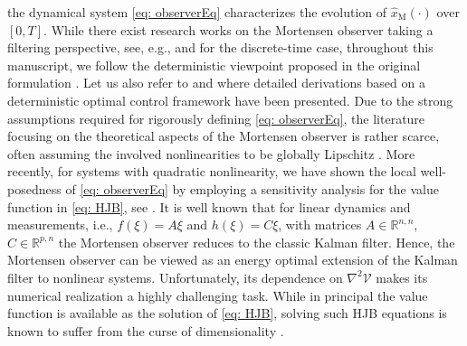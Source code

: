 \documentclass[11pt,reqno]{amsart}
\numberwithin{equation}{section}
\theoremstyle{plain}
\begin{document}
the dynamical system \eqref{eq: observerEq} characterizes the evolution of $\widehat{x}_{\mathrm{M}}(\cdot)$ over $[0,T]$. While there exist research works on the Mortensen observer taking a filtering perspective, see, e.g., \cite{Hij80,Hij82,ChaEtAl23,ChauMeMoZi25} and \cite{Moi18} for the discrete-time case, throughout this manuscript, we follow the deterministic viewpoint proposed in the original formulation \cite{Mor68}. Let us also refer to \cite{Fle97} and \cite{Wil04} where detailed derivations based on a deterministic optimal control framework have been presented. Due to the strong assumptions required for rigorously defining \eqref{eq: observerEq}, the literature focusing on the theoretical aspects of the Mortensen observer is rather scarce, often assuming the involved nonlinearities to be globally Lipschitz \cite{Kre03}. More recently, for systems with quadratic nonlinearity,  we have shown the local well-posedness of \eqref{eq: observerEq} by employing a sensitivity analysis for the value function in \eqref{eq: HJB}, see \cite{BreS24}. 
It is well known that for linear dynamics and measurements, i.e., $f(\xi) = A \xi $ and $h(\xi) = C \xi$, with matrices $A \in \mathbb{R}^{n,n}$, $C \in \mathbb{R}^{p,n}$ the Mortensen observer reduces to the classic Kalman filter.
%
Hence, the Mortensen observer can be viewed as an energy optimal extension of the Kalman filter to nonlinear systems. Unfortunately, its dependence on $\nabla^2 \mathcal{V}$ makes its numerical realization a highly challenging task. While in principal the value function is available as the solution of \eqref{eq: HJB}, solving such HJB equations is known to suffer from the curse of dimensionality \cite{Bel61}. 
\end{document}
